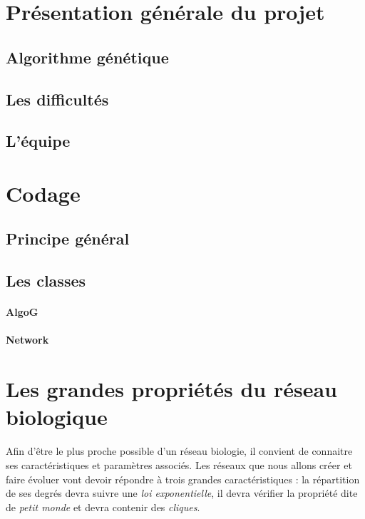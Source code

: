 


\maketitle


\section{Présentation générale du projet}

\subsection{Algorithme génétique}

\subsection{Les difficultés}

\subsection{L'équipe}


\section{Codage}

\subsection{Principe général}

\subsection{Les classes}
\paragraph*{AlgoG}
\paragraph*{Network}


\section{Les grandes propriétés du réseau biologique}
Afin d'être le plus proche possible d'un réseau biologie, il convient de connaitre ses caractéristiques et paramètres associés. Les réseaux que nous allons créer et faire évoluer vont devoir répondre à trois grandes caractéristiques : la répartition de ses degrés devra suivre une \textit{loi exponentielle}, il devra vérifier la propriété dite de \textit{\og petit monde \fg} et devra contenir des \textit{cliques}.

